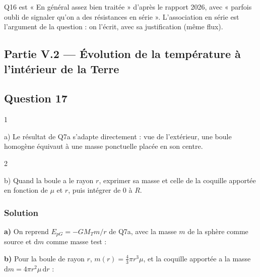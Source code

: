 \documentclass[11pt,a4paper]{article}
\newcommand{\equationajustee}[1]{%
  \sbox{\boiteequation}{$\displaystyle #1$}%
  \ifdim\wd\boiteequation>\linewidth
    \[\resizebox{\linewidth}{!}{\usebox{\boiteequation}}\]%
  \else
    \[#1\]%
  \fi}
\begin{document}
\begin{jury}

Q16 est « En général assez bien traitée » d'après le rapport 2026, avec « parfois oubli de signaler qu'on a des résistances en série ». L'association en série est l'argument de la question : on l'écrit, avec sa justification (même flux).

\end{jury}

\hypertarget{partie-v.2-uxe9volution-de-la-tempuxe9rature-uxe0-lintuxe9rieur-de-la-terre}{%
\subsection{Partie V.2 --- Évolution de la température à l'intérieur de la Terre}\label{partie-v.2-uxe9volution-de-la-tempuxe9rature-uxe0-lintuxe9rieur-de-la-terre}}

\hypertarget{question-17}{%
\subsection{Question 17}\label{question-17}}

\begin{indication}{1}

a) Le résultat de Q7a s'adapte directement : vue de l'extérieur, une boule homogène équivaut à une masse ponctuelle placée en son centre.

\end{indication}

\begin{indication}{2}

b) Quand la boule a le rayon \(r\), exprimer sa masse et celle de la coquille apportée en fonction de \(\mu\) et \(r\), puis intégrer de \(0\) à \(R\).

\end{indication}

\hypertarget{solution-16}{%
\subsubsection{Solution}\label{solution-16}}

\textbf{a)} On reprend \(E_{pG}=-GM_Tm/r\) de Q7a, avec la masse \(m\) de la sphère comme source et \(\mathrm dm\) comme masse test :

\equationajustee{\boxed{\mathrm dE_{pG}(r)=-\frac{Gm\,\mathrm dm}{r}}}

\textbf{b)} Pour la boule de rayon \(r\), \(m(r)=\frac43\pi r^3\mu\), et la coquille apportée a la masse \(\mathrm dm=4\pi r^2\mu\,\mathrm dr\) :
\end{document}
